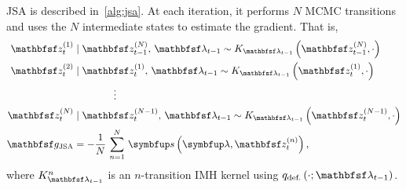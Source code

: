 \begin{proofEnd}

  JSA is described in~\cref{alg:jsa}. 
  At each iteration, it performs \(N\) MCMC transitions and uses the \(N\) intermediate states to estimate the gradient.
  That is,
  \begin{align*}
    \rvvz^{(1)}_{t} &\mid \rvvz_{t-1}^{(N)},\, \rvvlambda_{t-1} \sim K_{\rvvlambda_{t-1}}\left(\rvvz_{t-1}^{(N)}, \cdot\right) \\
    \rvvz^{(2)}_{t} &\mid \rvvz^{(1)}_{t},\, \rvvlambda_{t-1}  \sim K_{\rvvlambda_{t-1}}\left(\rvvz_{t}^{(1)}, \cdot\right) \\
    &\qquad\qquad\vdots
    \\
    \rvvz^{(N)}_{t} &\mid \rvvz^{(N-1)}_{t},\, \rvvlambda_{t-1}  \sim K_{\rvvlambda_{t-1}}\left(\rvvz_{t}^{(N-1)}, \cdot\right)
    \\
    \rvvg_{\text{JSA}}  &= -\frac{1}{N}\,\sum^{N}_{n=1} \, \vs\left(\vlambda, \rvvz^{(n)}_t\right),
  \end{align*}
  where \(K_{\rvvlambda_{t-1}}^n\) is an \(n\)-transition IMH kernel using \(q_{\text{def.}}\left(\cdot; \rvvlambda_{t-1}\right)\).


\end{proofEnd}
